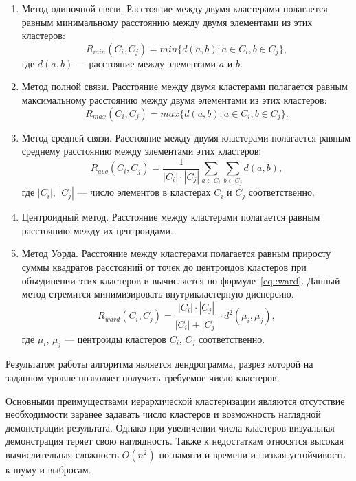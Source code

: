 \begin{enumerate}
	\item Метод одиночной связи. Расстояние между двумя кластерами полагается равным минимальному расстоянию между двумя элементами из этих кластеров: 
	\begin{equation} 
		R_{min}(C_i, C_j) = min\{d(a, b) : a \in C_i, b \in C_j\},
	\end{equation}
	где $d(a, b)$ --- расстояние между элементами $a$ и $b$.
	\item Метод полной связи. Расстояние между двумя кластерами полагается равным максимальному расстоянию между двумя элементами из этих кластеров: 
	\begin{equation} 
		R_{max}(C_i, C_j) = max\{d(a, b) : a \in C_i, b \in C_j\}.
	\end{equation}
	\item Метод средней связи. Расстояние между двумя кластерами полагается равным среднему расстоянию между элементами этих кластеров:
	\begin{equation} 
		R_{avg}(C_i, C_j) = \frac{1}{|C_i| \cdot |C_j|} \sum_{a \in C_i} \sum_{b \in C_j} d(a, b),
	\end{equation}
	где $|C_i|$, $|C_j|$ --- число элементов в кластерах $C_i$ и $C_j$ соответственно.
	\item Центроидный метод. Расстояние между кластерами полагается равным расстоянию между их центроидами.
	\item Метод Уорда. Расстояние между кластерами полагается равным приросту суммы квадратов расстояний от точек до центроидов кластеров при объединении этих кластеров и вычисляется по формуле~\ref{eq::ward}. Данный метод стремится минимизировать внутрикластерную дисперсию.
	\begin{equation} 
		R_{ward}(C_i, C_j) = \frac{|C_i| \cdot |C_j|}{|C_i| + |C_j|} \cdot d^2(\mu_i, \mu_j),
		\label{eq::ward}
	\end{equation}
	где $\mu_i$, $\mu_j$ --- центроиды кластеров $C_i$, $C_j$ соответственно.
\end{enumerate}

Результатом работы алгоритма является дендрограмма, разрез которой на заданном уровне позволяет получить требуемое число кластеров.

Основными преимуществами иерархической кластеризации являются отсутствие необходимости заранее задавать число кластеров и возможность наглядной демонстрации результата. Однако при увеличении числа кластеров визуальная демонстрация теряет свою наглядность. Также к недостаткам относятся высокая вычислительная сложность $O(n^2)$ по памяти и времени и низкая устойчивость к шуму и выбросам.

